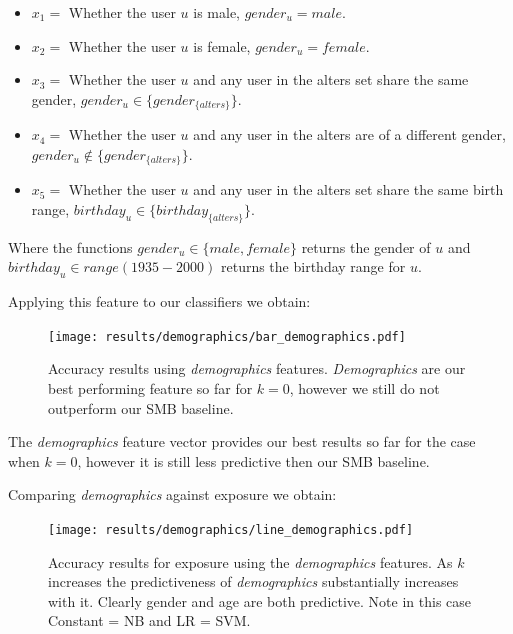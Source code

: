 \begin{itemize}
\item $x_1 = $ Whether the user $u$ is male, $gender_u = male$.
\item $x_2 = $ Whether the user $u$ is female, $gender_u = female$.
\item $x_3 = $ Whether the user $u$ and any user in the alters set share the same gender, $gender_u \in \{gender_{\{alters\}}\}$.
\item $x_4 = $ Whether the user $u$ and any user in the alters are of a different gender, $gender_u \not\in \{gender_{\{alters\}}\}$.
\item $x_5 = $ Whether the user $u$ and any user in the alters set share the same birth range, $birthday_u \in \{birthday_{\{alters\}}\}$.
\end{itemize}

Where the functions $gender_u \in \{male, female\}$ returns the gender of $u$ and $birthday_u \in range (1935-2000)$ returns the birthday range for $u$.

\clearpage

Applying this feature to our classifiers we obtain:

\begin{figure}[h]
	\begin{center}
		\texttt{[image: results/demographics/bar\_demographics.pdf]}
		\caption{Accuracy results using \emph{demographics} features. \emph{Demographics} are our best performing feature so far for $k=0$, 
				 however we still do not outperform our SMB baseline.}
	\end{center}
\end{figure}

The \emph{demographics} feature vector provides our best results so far for the case when $k=0$, however it is still less predictive then 
our SMB baseline.

\clearpage
	
Comparing \emph{demographics} against exposure we obtain:
	
\begin{figure}[h]
	\begin{center}
		\texttt{[image: results/demographics/line\_demographics.pdf]}
		\caption{Accuracy results for exposure using the \emph{demographics} features. As $k$ increases the predictiveness of \emph{demographics} substantially 
				 increases with it. Clearly gender and age are both predictive. Note in this case Constant = NB and LR = SVM.}
	\end{center}
\end{figure}

